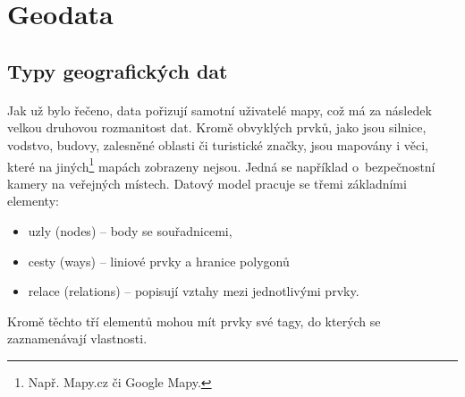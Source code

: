 \documentclass[11pt,a4paper,titlepage,oneside]{book}
\begin{document}


	\section{Geodata}
		\subsection{Typy geografických dat}






		\paragraph{} Jak už bylo řečeno, data pořizují samotní uživatelé mapy, což má za následek velkou druhovou rozmanitost dat. Kromě obvyklých prvků, jako jsou silnice, vodstvo, budovy, zalesněné oblasti či turistické značky, jsou mapovány i věci, které na jiných\footnote{Např. Mapy.cz či Google Mapy.} mapách zobrazeny nejsou. Jedná se například o~bezpečnostní kamery na veřejných místech. Datový model pracuje se třemi základními elementy:
	\begin{itemize}
		\item uzly (nodes) -- body se souřadnicemi,


		\item cesty (ways) -- liniové prvky a hranice polygonů


		\item relace (relations) -- popisují vztahy mezi jednotlivými prvky.
	\end{itemize}
Kromě těchto tří elementů mohou mít prvky své tagy, do kterých se zaznamenávají  vlastnosti. 	
\end{document}
